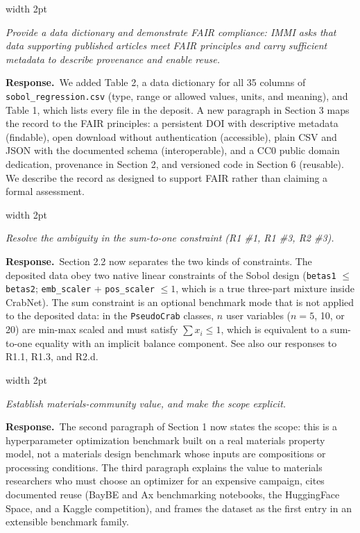 \documentclass[11pt]{article}
\newenvironment{comment}
  {\par\medskip\noindent
   \begingroup\color{revrule}\leaders\vrule width 2pt\hfill\kern0pt\par\nobreak
   \endgroup
   \begin{list}{}{\setlength{\leftmargin}{1.5em}\setlength{\rightmargin}{0.5em}}%
   \item\itshape\ignorespaces}
  {\end{list}\par}
\newcommand{\response}{\par\noindent\textbf{\color{respblue}Response.}\ }
\begin{document}
\begin{comment}
Provide a data dictionary and demonstrate FAIR compliance: IMMI asks that data supporting published articles meet FAIR principles and carry sufficient metadata to describe provenance and enable reuse.
\end{comment}
\response We added Table 2, a data dictionary for all 35 columns of \texttt{sobol\_regression.csv} (type, range or allowed values, units, and meaning), and Table 1, which lists every file in the deposit. A new paragraph in Section 3 maps the record to the FAIR principles: a persistent DOI with descriptive metadata (findable), open download without authentication (accessible), plain CSV and JSON with the documented schema (interoperable), and a CC0 public domain dedication, provenance in Section 2, and versioned code in Section 6 (reusable). We describe the record as designed to support FAIR rather than claiming a formal assessment.

\begin{comment}
Resolve the ambiguity in the sum-to-one constraint (R1 \#1, R1 \#3, R2 \#3).
\end{comment}
\response Section 2.2 now separates the two kinds of constraints. The deposited data obey two native linear constraints of the Sobol design (\texttt{betas1} $\le$ \texttt{betas2}; \texttt{emb\_scaler} + \texttt{pos\_scaler} $\le 1$, which is a true three-part mixture inside CrabNet). The sum constraint is an optional benchmark mode that is not applied to the deposited data: in the \texttt{PseudoCrab} classes, $n$ user variables ($n = 5$, 10, or 20) are min-max scaled and must satisfy $\sum x_i \le 1$, which is equivalent to a sum-to-one equality with an implicit balance component. See also our responses to R1.1, R1.3, and R2.d.

\begin{comment}
Establish materials-community value, and make the scope explicit.
\end{comment}
\response The second paragraph of Section 1 now states the scope: this is a hyperparameter optimization benchmark built on a real materials property model, not a materials design benchmark whose inputs are compositions or processing conditions. The third paragraph explains the value to materials researchers who must choose an optimizer for an expensive campaign, cites documented reuse (BayBE and Ax benchmarking notebooks, the HuggingFace Space, and a Kaggle competition), and frames the dataset as the first entry in an extensible benchmark family.
\end{document}
